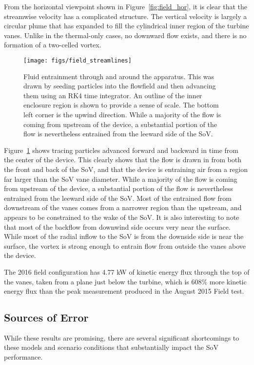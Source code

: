 From the horizontal viewpoint shown in Figure~\ref{fig:field_hor}, it is
clear that the streamwise velocity has a complicated structure. The
vertical velocity is largely a circular plume that has expanded to fill
the cylindrical inner region of the turbine vanes. Unlike in the
thermal-only cases, no downward flow exists, and there is no formation
of a two-celled vortex. 

\begin{figure}
  \centering
  \texttt{[image: figs/field\_streamlines]}
  \label{fig:field_stream}
 \caption{Fluid entrainment through and around the apparatus. This was
 drawn by seeding particles into the flowfield and then advancing them  
 using an RK4 time integrator. An outline of the inner enclosure region 
 is shown to provide a sense of scale. The bottom left corner is the
 upwind direction. While a majority of the flow is coming from upstream
 of the device, a substantial portion of the flow is nevertheless
 entrained from the leeward side of the SoV. }  
\end{figure}

Figure~\ref{fig:field_stream} shows tracing particles advanced forward
and backward in time from the center of the device. This clearly shows
that the flow is drawn in from both the front and back of the SoV, and
that the device is entraining air from a region far larger than the SoV
vane diameter.  While a majority of the flow is coming from upstream of
the device, a substantial portion of the flow is nevertheless  entrained
from the leeward side of the SoV. Most of the entrained flow from
downstream of the vanes comes from a narrower region than the upstream,
and appears to be constrained to the wake of the SoV. It is also
interesting to note that most of the backflow from downwind side occurs
very near the surface. While most of the radial inflow to the SoV is
from the downside side is near the surface, the vortex is strong enough
to entrain flow from outside the vanes above the device. 

The 2016 field configuration has 4.77 kW of kinetic energy flux through
the top of the vanes, taken from a plane just below the turbine, which
is 608\% more kinetic energy flux than the peak measurement produced in
the August 2015 Field test.  

\subsection{Sources of Error}
\label{sec:field_error}
%
While these results are promising, there are several significant
shortcomings to these models and scenario conditions that substantially
impact the SoV performance. 

